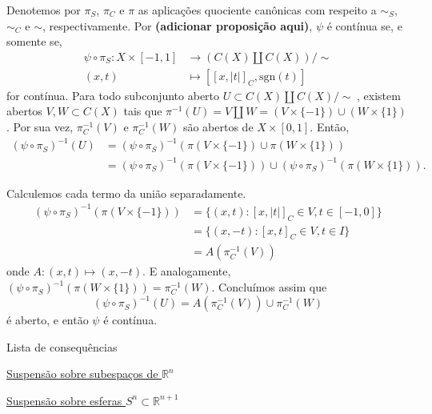 \begin{prop}
\begin{dem}
        Denotemos por $\pi_S$, $\pi_C$ e $\pi$ as aplicações quociente canônicas com respeito a $\sim_S$, $\sim_C$ e $\sim$, respectivamente. Por \textbf{(adicionar proposição aqui)}, $\psi$ é contínua se, e somente se,\begin{align*}
            \psi \circ \pi_S: X\times[-1,1] &\rightarrow (C(X) \amalg C(X))/ \sim\\
            (x,t) &\mapsto [[x,|t|]_C,\text{sgn}(t)]
        \end{align*}
        for contínua. Para todo subconjunto aberto $U \subset C(X)\amalg C(X)/\sim\hspace{3pt}$, existem abertos $V,W \subset C(X)$ tais que $\pi^{-1}(U) = V\amalg W = (V\times\{-1\}) \cup (W\times\{1\})$. Por sua vez, $\pi_C^{-1}(V)$ e $\pi_C^{-1}(W)$ são abertos de $X\times[0,1]$. Então,
        \begin{align*}
        (\psi \circ \pi_S)^{-1}(U)
        &= (\psi \circ \pi_S)^{-1}(\pi(V\times\{-1\}) \cup \pi(W\times\{1\}))\\
        &= (\psi \circ \pi_S)^{-1}(\pi(V\times\{-1\})) \cup (\psi \circ \pi_S)^{-1}(\pi(W\times\{1\})).   
        \end{align*}
        
        Calculemos cada termo da união separadamente.
        \begin{align*}
            (\psi \circ \pi_S)^{-1}(\pi(V\times\{-1\}))
            &= \{(x,t): [x,|t|]_C \in V, t \in [-1,0]\}\\
            &= \{(x,-t): [x,t]_C \in V, t \in I\}\\
            &= A(\pi_C^{-1}(V))   
        \end{align*}
        onde $A: (x,t) \mapsto (x,-t)$. E analogamente, $(\psi \circ \pi_S)^{-1}(\pi(W\times\{1\})) = \pi_C^{-1}(W)$. Concluímos assim que
        \[(\psi \circ \pi_S)^{-1}(U) = A(\pi_C^{-1}(V)) \cup \pi_C^{-1}(W)\]
        é aberto, e então $\psi$ é contínua.
    \end{dem}
\end{prop}


\begin{titlemize}{Lista de consequências}
    \item \hyperref[suspensao-euclidiano-prop]{Suspensão sobre subespaços de $\mathbb{R}^n$}
    \item \hyperref[suspensao-esfera-prop]{Suspensão sobre esferas $S^n\subset\mathbb{R}^{n+1}$}
\end{titlemize}

